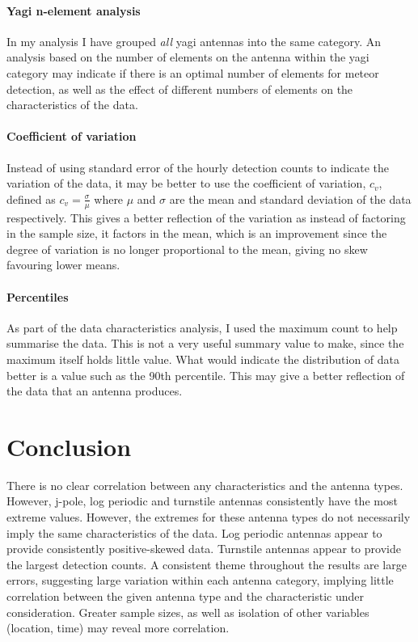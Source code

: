 \paragraph{Yagi n-element analysis\\}
In my analysis I have grouped {\it all} yagi antennas into the same category. An analysis based on the number of elements on the antenna within the yagi category may indicate if there is an optimal number of elements for meteor detection, as well as the effect of different numbers of elements on the characteristics of the data.
\paragraph{Coefficient of variation\\} 
Instead of using standard error of the hourly detection counts to indicate the variation of the data, it may be better to use the coefficient of variation, $c_v$, defined as $c_v = \frac{\sigma}{\mu}$ where $\mu$ and $\sigma$ are the mean and standard deviation of the data respectively. This gives a better reflection of the variation as instead of factoring in the sample size, it factors in the mean, which is an improvement since the degree of variation is no longer proportional to the mean, giving no skew favouring lower means.
\paragraph{Percentiles\\}
As part of the data characteristics analysis, I used the maximum count to help summarise the data. This is not a very useful summary value to make, since the maximum itself holds little value. What would indicate the distribution of data better is a value such as the 90th percentile. This may give a better reflection of the data that an antenna produces.
\section{Conclusion}
There is no clear correlation between any characteristics and the antenna types. However, j-pole, log periodic and turnstile antennas consistently have the most extreme values. However, the extremes for these antenna types do not necessarily imply the same characteristics of the data. Log periodic antennas appear to provide consistently positive-skewed data. Turnstile antennas appear to provide the largest detection counts. A consistent theme throughout the results are large errors, suggesting large variation within each antenna category, implying little correlation between the given antenna type and the characteristic under consideration. Greater sample sizes, as well as isolation of other variables (location, time) may reveal more correlation.